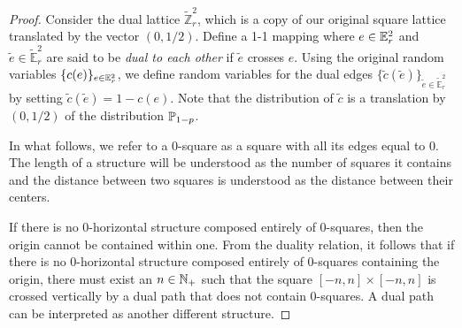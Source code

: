 \begin{proof}

            Consider the dual lattice $\tilde{\mathbb{Z}}_r^2$, which is a copy of our original square lattice translated by the vector $(0, 1/2)$. Define a 1-1 mapping where $e \in \mathbb{E}_r^2$ and $\tilde{e} \in \tilde{\mathbb{E}}_r^2$ are said to be \emph{dual to each other} if $\tilde{e}$ crosses $e$. Using the original random variables $\{c(e)\}_{e \in \mathbb{E}_r^2}$, we define random variables for the dual edges $\{\tilde{c}(\tilde{e})\}_{\tilde{e} \in \tilde{\mathbb{E}}_r^2}$ by setting $\tilde{c}(\tilde{e}) = 1 - c(e)$. Note that the distribution of $\tilde{c}$ is a translation by $(0, 1/2)$ of the distribution $\mathbb{P}_{1-p}$.
 
            In what follows, we refer to a 0-square as a square with all its edges equal to 0. The length of a structure will be understood as the number of squares it contains and the distance between two squares is understood as the distance between their centers.
            
            If there is no 0-horizontal structure composed entirely of 0-squares, then the origin cannot be contained within one. From the duality relation, it follows that if there is no 0-horizontal structure composed entirely of 0-squares containing the origin, there must exist an $n \in \mathbb{N}_+$ such that the square $[-n, n] \times [-n, n]$ is crossed vertically by a dual path that does not contain 0-squares. A dual path can be interpreted as another different structure. 


\end{proof}
